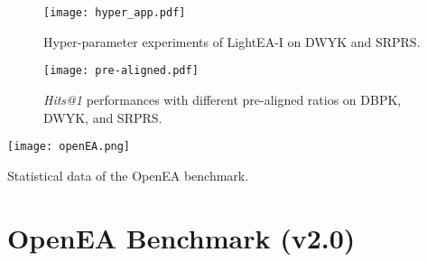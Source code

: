 \documentclass[11pt]{article}
\begin{document}
\begin{figure*}[t]
    \centering
    \texttt{[image: hyper\_app.pdf]}
    \caption{Hyper-parameter experiments of LightEA-I on DWYK and SRPRS.}
    \label{fig:hyperapp}
\end{figure*}

\begin{figure*}[t]
    \centering
    \texttt{[image: pre-aligned.pdf]}
    \caption{\emph{Hits@1} performances with different pre-aligned ratios on DBPK, DWYK, and SRPRS.}
    \label{fig:pre-aligned}
\end{figure*}

\begin{table*}[t]
    \centering
    \texttt{[image: openEA.png]}
    \caption{Statistical data of the OpenEA benchmark.}
    \label{table:openea}
\end{table*}

\clearpage
\clearpage

\section{OpenEA Benchmark (v2.0)}
\label{sec:openEA}
\end{document}
